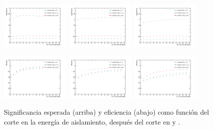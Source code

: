 \begin{figure}[!htbp]
  \centering

  \includegraphics[width=0.3\textwidth]{figures/iso_20_sig}
  \includegraphics[width=0.3\textwidth]{figures/iso_30_sig}
  \includegraphics[width=0.3\textwidth]{figures/iso_40_sig}

  \includegraphics[width=0.3\textwidth]{figures/iso_20_eff}
  \includegraphics[width=0.3\textwidth]{figures/iso_30_eff}
  \includegraphics[width=0.3\textwidth]{figures/iso_40_eff}

  \caption{Significancia esperada (arriba) y eficiencia (abajo) como función del
    corte en la energía de aislamiento, después del corte en {\pt} y {\met}.}
  \label{fig:photon_iso_sig}
\end{figure}



